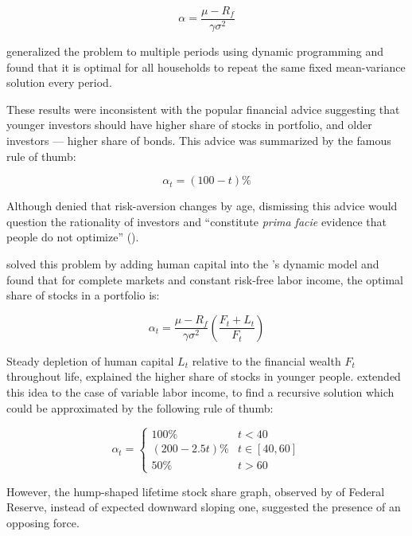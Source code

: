 \documentclass[]{elsarticle}
\begin{document}
\begin{equation}\label{eq:markowitz}
	\alpha = \frac{\mu - R_f}{\gamma\sigma^2}
\end{equation}

\citet{merton} generalized the problem to multiple periods using dynamic programming and found that it is optimal for all households to repeat the same fixed mean-variance solution every period.

These results were inconsistent with the popular financial advice suggesting that younger investors should have higher share of stocks in portfolio, and older investors --- higher share of bonds. This advice was summarized by the famous rule of thumb:

\begin{equation}\label{eq:stominus}
	\alpha_t = (100 - t)\%
\end{equation}

Although \citet{samuelson} denied that risk-aversion changes by age, dismissing this advice would question the rationality of investors and ``constitute \textit{prima facie} evidence that people do not optimize'' (\citet{canner}).

\citet{bodie} solved this problem by adding human capital into the \citet{merton}'s dynamic model and found that for complete markets and constant risk-free labor income, the optimal share of stocks in a portfolio is:

\begin{equation}\label{eq:bodie}
	\alpha_t = \frac{\mu - R_f}{\gamma \sigma^2} \left( \frac{F_t + L_t}{F_t} \right)
\end{equation}

Steady depletion of human capital $L_t$ relative to the financial wealth $F_t$ throughout life, explained the higher share of stocks in younger people. \citet{cgm} extended this idea to the case of variable labor income, to find a recursive solution which could be approximated by the following rule of thumb:

\begin{equation}\label{eq:cgm}
	\alpha_t =
	\begin{cases}
		100\% 			& 	t<40\\
		(200-2.5t)\% 	& 	t\in[40,60]\\
		50\% 			& 	t>60
	\end{cases}
\end{equation}


However, the hump-shaped lifetime stock share graph, observed by \citet{chang} of Federal Reserve, instead of expected downward sloping one, suggested the presence of an opposing force.
\end{document}

